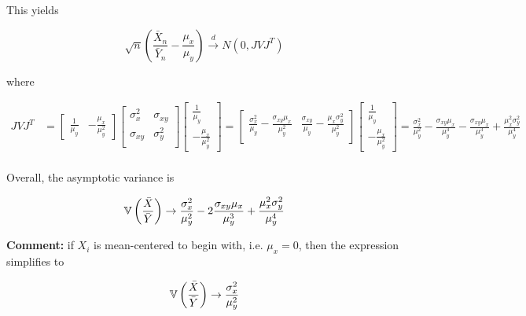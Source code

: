 \documentclass{article}
\begin{document}
This yields

\begin{equation*}
\sqrt{n}\left(\frac{\bar{X}_n}{\bar{Y}_n} - \frac{\mu_x}{\mu_y}\right) \xrightarrow{d} N(0, JVJ^T)
\end{equation*}

where


\begin{align*}
    JVJ^T &= \begin{bmatrix}
\frac{1}{\mu_y} &  -\frac{\mu_x}{\mu_y^2}
\end{bmatrix} 
\begin{bmatrix}
    \sigma_x^2   &  \sigma_{xy}\\
    \sigma_{xy} & \sigma_y^2  \\
\end{bmatrix}
\begin{bmatrix}
\frac{1}{\mu_y} \\ -\frac{\mu_x}{\mu_y^2}
\end{bmatrix} =\begin{bmatrix}
  \frac{\sigma_x^2}{\mu_y} - \frac{\sigma_{xy}\mu_x}{\mu_y^2}  & \frac{\sigma_{xy}}{\mu_y} - \frac{\mu_x\sigma_{y}^2}{\mu_y^2} \\
\end{bmatrix}
\begin{bmatrix}
\frac{1}{\mu_y} \\ -\frac{\mu_x}{\mu_y^2}
\end{bmatrix} =
  \frac{\sigma_x^2}{\mu_y^2} - \frac{\sigma_{xy}\mu_x}{\mu_y^3}  - \frac{\sigma_{xy}\mu_x}{\mu_y^3} + \frac{\mu_x^2\sigma_{y}^2}{\mu_y^4} \\
\end{align*}

Overall, the asymptotic variance is

\begin{equation}\label{eq-ratiovar}
  \mathbb{V}\left(\frac{\bar{X}}{\bar{Y}}\right)\rightarrow  \frac{\sigma_x^2}{\mu_y^2} - 2\frac{\sigma_{xy}\mu_x}{\mu_y^3}  + \frac{\mu_x^2\sigma_{y}^2}{\mu_y^4}
\end{equation}

\textbf{Comment:} if $X_i$ is mean-centered to begin with, i.e. $\mu_x=0$, then the expression simplifies to

\begin{equation}\label{eq-ratiovar}
  \mathbb{V}\left(\frac{\bar{X}}{\bar{Y}}\right)\rightarrow  \frac{\sigma_x^2}{\mu_y^2}
\end{equation}
\end{document}
